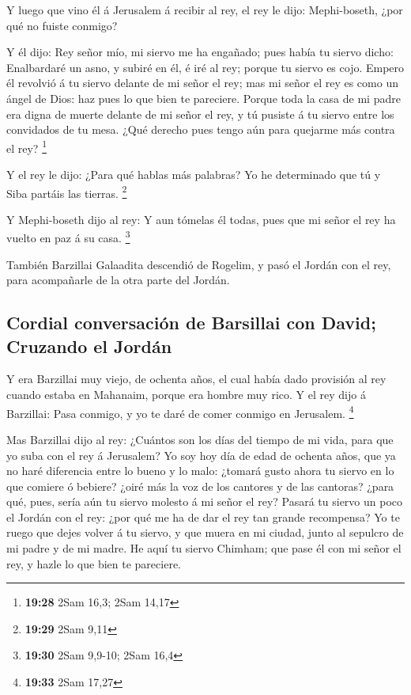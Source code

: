  Y luego que vino él á Jerusalem á recibir al rey, el rey
le dijo: Mephi-boseth, ¿por qué no fuiste conmigo?

 Y él dijo: Rey señor mío, mi siervo me ha engañado; pues
había tu siervo dicho: Enalbardaré un asno, y subiré en él, é iré al
rey; porque tu siervo es cojo.  Empero él revolvió á tu
siervo delante de mi señor el rey; mas mi señor el rey es como un ángel
de Dios: haz pues lo que bien te pareciere.  Porque toda la
casa de mi padre era digna de muerte delante de mi señor el rey, y tú
pusiste á tu siervo entre los convidados de tu mesa. ¿Qué derecho pues
tengo aún para quejarme más contra el rey? \footnote{\textbf{19:28} 2Sam
  16,3; 2Sam 14,17}

 Y el rey le dijo: ¿Para qué hablas más palabras? Yo he
determinado que tú y Siba partáis las tierras. \footnote{\textbf{19:29}
  2Sam 9,11}

 Y Mephi-boseth dijo al rey: Y aun tómelas él todas, pues
que mi señor el rey ha vuelto en paz á su casa. \footnote{\textbf{19:30}
  2Sam 9,9-10; 2Sam 16,4}

 También Barzillai Galaadita descendió de Rogelim, y pasó
el Jordán con el rey, para acompañarle de la otra parte del Jordán.

\hypertarget{cordial-conversaciuxf3n-de-barsillai-con-david-cruzando-el-jorduxe1n}{%
\subsection{Cordial conversación de Barsillai con David; Cruzando el
Jordán}\label{cordial-conversaciuxf3n-de-barsillai-con-david-cruzando-el-jorduxe1n}}

 Y era Barzillai muy viejo, de ochenta años, el cual había
dado provisión al rey cuando estaba en Mahanaim, porque era hombre muy
rico.  Y el rey dijo á Barzillai: Pasa conmigo, y yo te
daré de comer conmigo en Jerusalem. \footnote{\textbf{19:33} 2Sam 17,27}

 Mas Barzillai dijo al rey: ¿Cuántos son los días del
tiempo de mi vida, para que yo suba con el rey á Jerusalem?
 Yo soy hoy día de edad de ochenta años, que ya no haré
diferencia entre lo bueno y lo malo: ¿tomará gusto ahora tu siervo en lo
que comiere ó bebiere? ¿oiré más la voz de los cantores y de las
cantoras? ¿para qué, pues, sería aún tu siervo molesto á mi señor el
rey?  Pasará tu siervo un poco el Jordán con el rey: ¿por
qué me ha de dar el rey tan grande recompensa?  Yo te ruego
que dejes volver á tu siervo, y que muera en mi ciudad, junto al
sepulcro de mi padre y de mi madre. He aquí tu siervo Chimham; que pase
él con mi señor el rey, y hazle lo que bien te pareciere.

